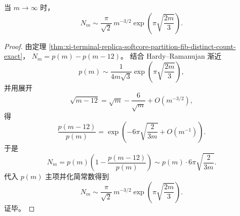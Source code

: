 \begin{corollary}\label{cor:xi-terminal-replica-softcore-partition-fib-distinct-count-asymptotic}
当 \(m\to\infty\) 时，
\[
N_m\sim \frac{\pi}{\sqrt2}\,m^{-3/2}
\exp\!\left(\pi\sqrt{\frac{2m}{3}}\right).
\]
\end{corollary}
\begin{proof}
由定理 \ref{thm:xi-terminal-replica-softcore-partition-fib-distinct-count-exact}，
\(
N_m=p(m)-p(m-12)
\)。
结合 Hardy--Ramanujan 渐近
\[
p(m)\sim \frac{1}{4m\sqrt3}\exp\!\left(\pi\sqrt{\frac{2m}{3}}\right),
\]
并用展开
\[
\sqrt{m-12}
=\sqrt m-\frac{6}{\sqrt m}+O(m^{-3/2}),
\]
得
\[
\frac{p(m-12)}{p(m)}
=\exp\!\left(-6\pi\sqrt{\frac{2}{3m}}+O(m^{-1})\right).
\]
于是
\[
N_m
=p(m)\left(1-\frac{p(m-12)}{p(m)}\right)
\sim p(m)\cdot 6\pi\sqrt{\frac{2}{3m}}.
\]
代入 \(p(m)\) 主项并化简常数得到
\[
N_m\sim \frac{\pi}{\sqrt2}\,m^{-3/2}
\exp\!\left(\pi\sqrt{\frac{2m}{3}}\right).
\]
证毕。
\end{proof}

\endinput
